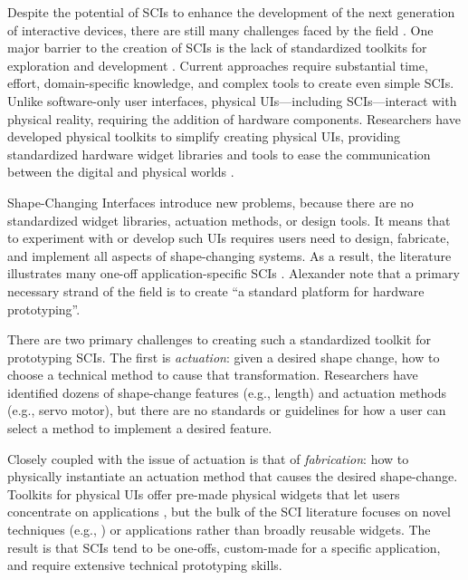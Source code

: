     Despite the potential of SCIs to enhance the development of the
    next generation of interactive devices, there are still many challenges
    faced by the field \cite{10.1145/3173574.3173873}. One major barrier to
    the creation of SCIs is the lack of standardized toolkits for
    exploration and development \cite{10.1145/3173574.3173873}. Current
    approaches require substantial time, effort, domain-specific knowledge,
    and complex tools to create even simple SCIs. Unlike software-only
    user interfaces, physical UIs---including SCIs---interact with
    physical reality, requiring the addition of hardware components.
    Researchers have developed physical toolkits to simplify creating physical
    UIs, providing standardized hardware widget libraries
    \cite{Greenberg:2001,Bdeir:2009kz} and tools to ease the communication
    between the digital and physical worlds \cite{Hartmann:2007p4338}.
    
    Shape-Changing Interfaces introduce new problems, because there are no
    standardized widget libraries, actuation methods, or design tools. It
    means that to experiment with or develop such UIs requires users need to
    design, fabricate, and implement all aspects of shape-changing systems. As
    a result, the literature illustrates many one-off application-specific
    SCIs \cite{Sturdee:2018ce}. Alexander \etal note that a primary necessary
    strand of the field is to create ``a standard platform for hardware
    prototyping''.
    
    There are two primary challenges to creating such a standardized toolkit
    for prototyping SCIs. The first is \textit{actuation}: given a
    desired shape change, how to choose a technical method to cause that
    transformation. Researchers have identified dozens of shape-change
    features \cite{10.1145/3173574.3174193} (e.g., length) and actuation
    methods \cite{Sturdee:2018ce} (e.g., servo motor), but there are no
    standards or guidelines for how a user can select a method to implement a
    desired feature.
    
    Closely coupled with the issue of actuation is that of
    \textit{fabrication}: how to physically instantiate an actuation method
    that causes the desired shape-change. Toolkits for physical UIs offer
    pre-made physical widgets that let users concentrate on applications
    \cite{Greenberg:2001,Bdeir:2009kz}, but the bulk of the SCI literature
    focuses on novel techniques (e.g., \cite{10.1145/2984511.2984520}) or
    applications rather than broadly reusable widgets. The result is that SCIs
    tend to be one-offs, custom-made for a specific application, and require
    extensive technical prototyping skills.
  
